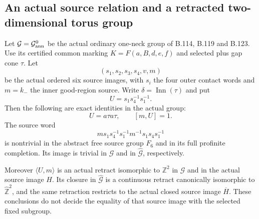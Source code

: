 \subsection*{An actual source relation and a retracted two-dimensional torus group}

\label{stmt:B130}
Let $\mathcal G=\mathcal G^0_{\rm ann}$ be the actual ordinary
one-neck group of B.114, B.119 and B.123. Use its certified common
marking $K=F(a,B,d,e,f)$ and selected plus gap cone $\tau$.
Let
\[
 (s_1,s_2,s_3,s_4,v,m)
\]
be the actual ordered six source images, with $s_i$ the four
outer contact words and $m=k_-$ the inner good-region source.
Write $\delta=\operatorname{Inn}(\tau)$ and put
\begin{equation}\label{eq:B130-U}
 U=s_1s_4^{-1}s_1^{-1}.
\end{equation}
Then the following are exact identities in the actual group:
\begin{equation}\label{eq:B130-actual-relation}
 U=a\tau a\tau,\qquad [m,U]=1.
\end{equation}
The source word
\begin{equation}\label{eq:B130-source-word}
 m s_1s_4^{-1}s_1^{-1}m^{-1}s_1s_4s_1^{-1}
\end{equation}
is nontrivial in the abstract free source group $F_6$ and in its
full profinite completion. Its image is trivial in $\mathcal G$
and in $\widehat{\mathcal G}$, respectively.

Moreover $\langle U,m\rangle$ is an actual retract isomorphic to
$\mathbb Z^2$ in $\mathcal G$ and in the actual source image $H$.
Its closure in $\widehat{\mathcal G}$ is a continuous retract
canonically isomorphic to $\widehat{\mathbb Z}^2$, and the
same retraction restricts to the actual closed source image
$\overline H$. These conclusions do not decide the equality
of that source image with the selected fixed subgroup.

